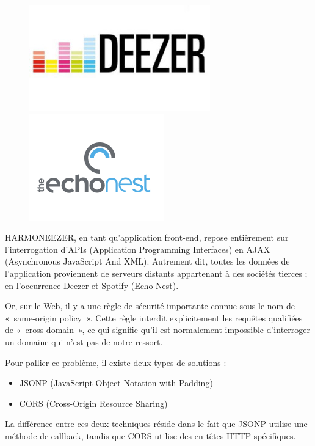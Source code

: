 \documentclass[a4paper,12pt]{article}
\begin{document}
\begin{figure}[!h]
  \begin{center}
    \includegraphics[scale=0.5]{logo-deezer.jpg}
    \includegraphics[scale=0.5]{logo-echonest.png}
  \end{center}
\end{figure}

HARMONEEZER, en tant qu'application front-end, repose entièrement sur l'interrogation d'APIs (Application Programming Interfaces) en AJAX (Asynchronous JavaScript And XML). Autrement dit, toutes les données de l'application proviennent de serveurs distants appartenant à des sociétés tierces ; en l'occurrence Deezer et Spotify (Echo Nest).

Or, sur le Web, il y a une règle de sécurité importante connue sous le nom de «~same-origin policy~». Cette règle interdit explicitement les requêtes qualifiées de «~cross-domain~», ce qui signifie qu'il est normalement impossible d'interroger un domaine qui n'est pas de notre ressort.

Pour pallier ce problème, il existe deux types de solutions :

\begin{itemize}
 \item{JSONP (JavaScript Object Notation with Padding)}
 \item{CORS (Cross-Origin Resource Sharing)}
\end{itemize}

La différence entre ces deux techniques réside dans le fait que JSONP utilise une méthode de callback, tandis que CORS utilise des en-têtes HTTP spécifiques.
\end{document}
